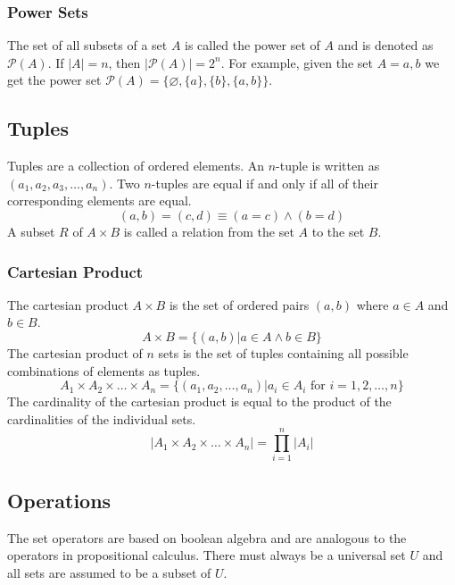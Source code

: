 \documentclass[a4paper, 10pt]{article}
\begin{document}
\subsubsection{Power Sets}
The set of all subsets of a set \(A\) is called the power set of \(A\) and is denoted as \(\mathcal{P}(A)\). If \(|A| = n\), then \(|\mathcal{P}(A)| = 2^n\). For example, given the set \(A = {a, b}\) we get the power set \(\mathcal{P}(A) = \{\varnothing, \{a\}, \{b\}, \{a,b\}\}\).

\subsection{Tuples}
Tuples are a collection of ordered elements. An \(n\)-tuple is written as \((a_1, a_2, a_3,\ldots,a_n).\) Two \(n\)-tuples are equal if and only if all of their corresponding elements are equal.
\[(a,b) = (c,d)\equiv (a=c) \land (b=d)\]
A subset \(R\) of \(A\times B\) is called a relation from the set \(A\) to the set \(B\).

\subsubsection{Cartesian Product}
The cartesian product \(A\times B\) is the set of ordered pairs \((a,b)\) where \(a\in A\) and \(b\in B\).
\[A\times B = \{(a,b)|a\in A \land b\in B\}\]
The cartesian product of \(n\) sets is the set of tuples containing all possible combinations of elements as tuples.
\[ A_1\times A_2\times\ldots\times A_n = \{(a_1, a_2,\ldots, a_n)|a_i\in A_i \text{ for } i=1, 2,\ldots,n\} \]
The cardinality of the cartesian product is equal to the product of the cardinalities of the individual sets.
\[|A_1\times A_2\times\ldots\times A_n| = \prod_{i=1}^n|A_i| \]

\newpage
\subsection{Operations}
The set operators are based on boolean algebra and are analogous to the operators in propositional calculus. There must always be a universal set \(U\) and all sets are assumed to be a subset of \(U\).
\end{document}
